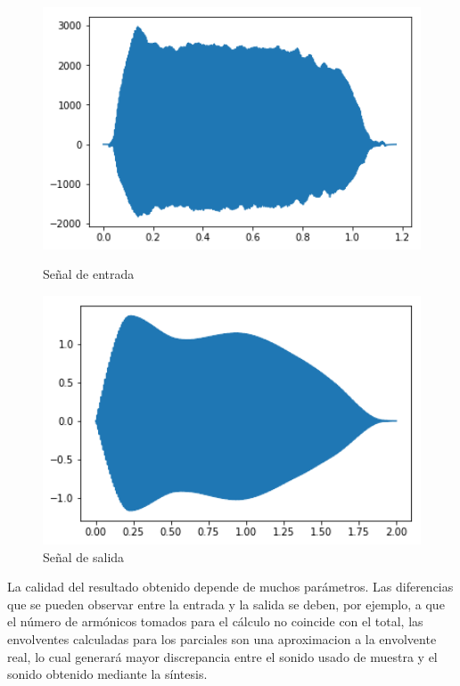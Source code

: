 \documentclass[assd_tp2_main.tex]{subfiles}
\begin{document}
\begin{figure}[H]
\centering
  \begin{minipage}{0.4\textwidth}
    \centering
    \includegraphics[width=1\textwidth]{graficos/entrada.png}
    \caption{Señal de entrada}
    \label{fig:uno}
  \end{minipage}%
  \hspace{5mm}
  \begin{minipage}{0.4\textwidth}
    \centering
    \includegraphics[width=1\textwidth]{graficos/salida.png}
    \caption{Señal de salida}
    \label{fig:dos}
  \end{minipage}
\end{figure}

La calidad del resultado obtenido depende de muchos parámetros. Las diferencias que se pueden observar entre la entrada y la salida se deben, por ejemplo, a que el número de armónicos tomados para el cálculo no coincide con el total, las envolventes calculadas para los parciales son una aproximacion a la envolvente real, lo cual generará mayor discrepancia entre el sonido usado de muestra y el sonido obtenido mediante la síntesis.
\end{document}
